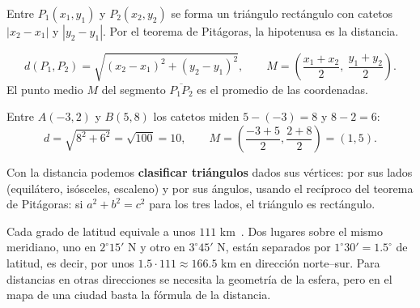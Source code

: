 \documentclass[11pt]{article}
\begin{document}
Entre $P_1(x_1, y_1)$ y $P_2(x_2, y_2)$ se forma un triángulo rectángulo con
catetos $|x_2 - x_1|$ y $|y_2 - y_1|$. Por el teorema de Pitágoras, la
hipotenusa es la distancia.

\begin{teorema}
\[
  d(P_1, P_2) = \sqrt{(x_2 - x_1)^2 + (y_2 - y_1)^2},
  \qquad
  M = \left( \frac{x_1 + x_2}{2},\ \frac{y_1 + y_2}{2} \right).
\]
El punto medio $M$ del segmento $\overline{P_1P_2}$ es el promedio de las
coordenadas.
\end{teorema}

\begin{ejemplo}
Entre $A(-3, 2)$ y $B(5, 8)$ los catetos miden $5 - (-3) = 8$ y $8 - 2 = 6$:
\[ d = \sqrt{8^2 + 6^2} = \sqrt{100} = 10, \qquad
   M = \left(\frac{-3 + 5}{2}, \frac{2 + 8}{2}\right) = (1, 5). \]

\begin{center}
\end{center}
\end{ejemplo}

Con la distancia podemos \textbf{clasificar triángulos} dados sus vértices:
por sus lados (equilátero, isósceles, escaleno) y por sus ángulos, usando el
recíproco del teorema de Pitágoras: si $a^2 + b^2 = c^2$ para los tres lados,
el triángulo es rectángulo.

\begin{aplicacion}
Cada grado de latitud equivale a unos $111$ km~\cite{noaa}. Dos lugares sobre
el mismo meridiano, uno en $2^\circ 15'$ N y otro en $3^\circ 45'$ N, están
separados por $1^\circ 30' = \num{1,5}^\circ$ de latitud, es decir, por unos
$\num{1,5} \cdot 111 \approx \num{166,5}$ km en dirección norte--sur. Para
distancias en otras direcciones se necesita la geometría de la esfera, pero en
el mapa de una ciudad basta la fórmula de la distancia.
\end{aplicacion}
\end{document}
